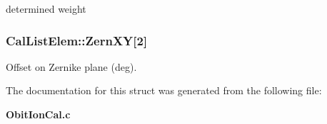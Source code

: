 determined weight 

\subsubsection{ {\bf Cal\-List\-Elem::Zern\-XY}[2]}\label{structCalListElem_o2}


Offset on Zernike plane (deg). 



The documentation for this struct was generated from the following file:\begin{CompactItemize}
\item 
{\bf Obit\-Ion\-Cal.c}\end{CompactItemize}
